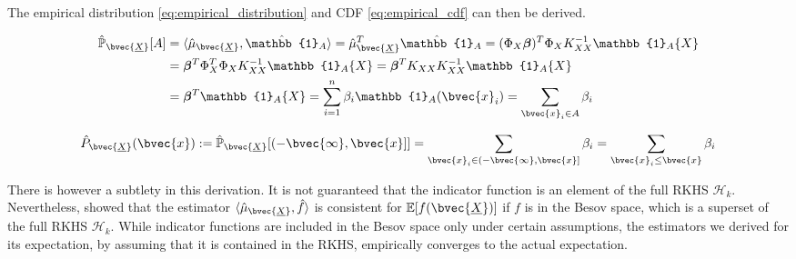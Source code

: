 \documentclass[twoside]{article} \usepackage{aistats2017}
\newcommand{\rv}[1]{\underline{#1}}
\newcommand{\ds}[1]{{#1}}
\begin{document}
		The empirical distribution \eqref{eq:empirical_distribution} and CDF \eqref{eq:empirical_cdf} can then be derived.
		
		\begin{equation}
		\begin{aligned}
			\hat{\mathbb{P}}_{\bvec{\rv{X}}}[A] &= \langle \hat{\mu}_{\bvec{\rv{X}}}, \hat{\mathbb{1}}_{A} \rangle = \hat{\mu}_{\bvec{\rv{X}}}^{T}\hat{\mathbb{1}}_{A} = (\Phi_{\ds{X}} \bm{\beta})^{T} \Phi_{\ds{X}} K_{\ds{X} \ds{X}}^{-1} \mathbb{1}_{A}\{\ds{X}\} \\
			&= \bm{\beta}^{T} \Phi_{\ds{X}}^{T} \Phi_{\ds{X}} K_{\ds{X} \ds{X}}^{-1} \mathbb{1}_{A}\{\ds{X}\} = \bm{\beta}^{T} K_{\ds{X} \ds{X}} K_{\ds{X} \ds{X}}^{-1} \mathbb{1}_{A}\{\ds{X}\} \\
			&= \bm{\beta}^{T} \mathbb{1}_{A}\{\ds{X}\} = \sum_{i = 1}^{n} \beta_{i} \mathbb{1}_{A}(\bvec{x}_{i}) = \sum_{\bvec{x}_{i} \in A} \beta_{i}
		\end{aligned}
		\label{eq:empirical_distribution}
		\end{equation}
		
		\begin{equation}
			\hat{P}_{\bvec{\rv{X}}}(\bvec{x}) := \hat{\mathbb{P}}_{\bvec{\rv{X}}}[(-\bvec{\infty}, \bvec{x}]] = \sum_{\bvec{x}_{i} \in (-\bvec{\infty}, \bvec{x}]} \beta_{i} = \sum_{\bvec{x}_{i} \leq \bvec{x}} \beta_{i}
		\label{eq:empirical_cdf}
		\end{equation}
		
		There is however a subtlety in this derivation. It is not guaranteed that the indicator function is an element of the full RKHS $\mathcal{H}_{k}$. Nevertheless, \cite{Kanagawa:RecoveringDistributions} showed that the estimator $\langle \hat{\mu}_{\bvec{\rv{X}}}, \hat{f} \rangle$ is consistent for $\mathbb{E}[f(\bvec{\rv{X}})]$ if $f$ is in the Besov space, which is a superset of the full RKHS $\mathcal{H}_{k}$. While indicator functions are included in the Besov space only under certain assumptions, the estimators we derived for its expectation, by assuming that it is contained in the RKHS, empirically converges to the actual expectation.
		
\end{document}

